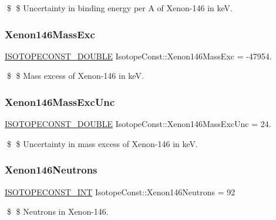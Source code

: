 \$ \$ Uncertainty in binding energy per A of Xenon-\/146 in keV. \mbox{\label{group___isotope_const-_xenon-_xe146_ga2894df026ce30691996c5e7e31d36376}} 
\subsubsection{\texorpdfstring{Xenon146\+Mass\+Exc}{Xenon146MassExc}}
{\footnotesize\ttfamily \mbox{\hyperlink{group___isotope_const-_macros_ga8f45a7272ce02c0b4c65c44636ed719a}{I\+S\+O\+T\+O\+P\+E\+C\+O\+N\+S\+T\+\_\+\+D\+O\+U\+B\+LE}} Isotope\+Const\+::\+Xenon146\+Mass\+Exc = -\/47954.}

\$ \$ Mass excess of Xenon-\/146 in keV. \mbox{\label{group___isotope_const-_xenon-_xe146_ga09e8f994b8c65d64dc8e173fc6422e47}} 
\subsubsection{\texorpdfstring{Xenon146\+Mass\+Exc\+Unc}{Xenon146MassExcUnc}}
{\footnotesize\ttfamily \mbox{\hyperlink{group___isotope_const-_macros_ga8f45a7272ce02c0b4c65c44636ed719a}{I\+S\+O\+T\+O\+P\+E\+C\+O\+N\+S\+T\+\_\+\+D\+O\+U\+B\+LE}} Isotope\+Const\+::\+Xenon146\+Mass\+Exc\+Unc = 24.}

\$ \$ Uncertainty in mass excess of Xenon-\/146 in keV. \mbox{\label{group___isotope_const-_xenon-_xe146_gad1125aa0728ba31830823a2ea1569148}} 
\subsubsection{\texorpdfstring{Xenon146\+Neutrons}{Xenon146Neutrons}}
{\footnotesize\ttfamily \mbox{\hyperlink{group___isotope_const-_macros_ga5f18360b3e99483a35c32d789e62621c}{I\+S\+O\+T\+O\+P\+E\+C\+O\+N\+S\+T\+\_\+\+I\+NT}} Isotope\+Const\+::\+Xenon146\+Neutrons = 92}

\$ \$ Neutrons in Xenon-\/146. \mbox{\label{group___isotope_const-_xenon-_xe146_ga3a57668c490312720c2c2d210d5b75aa}} 
